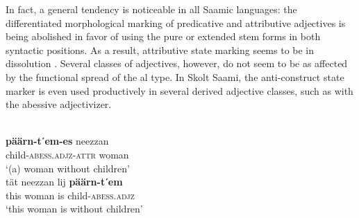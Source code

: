 In fact, a general tendency is noticeable in all Saamic languages: the differentiated morphological marking of predicative and attributive adjectives is being abolished in favor of using the pure or extended stem forms in both syntactic positions. As a result, attributive state marking seems to be in dissolution \citep{riesler2006b}. Several classes of adjectives, however, do not seem to be as affected by the functional spread of the al type. In Skolt Saami, the anti\hyp{}construct state marker is even used productively in several derived adjective classes, such as with the abessive adjectivizer.
\begin{exe}
\begin{xlist}
\\
\gll	\textbf{päärn-tʹem-es} neezzan\\
	child-\textsc{abess.adjz-attr} woman\\
\glt	‘(a) woman without children’
\\
\gll 	tät neezzan lij \textbf{päärn-tʹem}\\
	this woman is child-\textsc{abess.adjz}\\
\glt	‘this woman is without children’
\end{xlist}
\end{exe}

